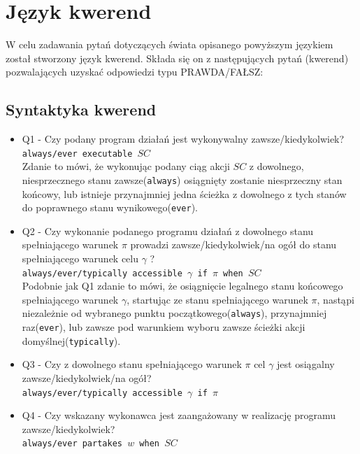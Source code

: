\documentclass{article}
\begin{document}
\newpage
\section{Język kwerend}
W celu zadawania pytań dotyczących świata opisanego powyższym językiem został stworzony język kwerend. Składa się on z następujących pytań (kwerend) pozwalających uzyskać odpowiedzi typu PRAWDA/FAŁSZ:

\subsection{Syntaktyka kwerend}
\begin{itemize}
\item Q1 - Czy podany program działań jest wykonywalny zawsze/kiedykolwiek?\\
{\large\texttt{always/ever executable $SC$}} \\
Zdanie to mówi, że wykonując podany ciąg akcji $SC$ z dowolnego, niesprzecznego stanu zawsze(\texttt{always}) osiągnięty zostanie niesprzeczny stan końcowy, lub istnieje przynajmniej jedna ścieżka z dowolnego z tych stanów do poprawnego stanu wynikowego(\texttt{ever}).


\item Q2 - Czy wykonanie podanego programu działań z dowolnego stanu spełniającego warunek $\pi$ prowadzi zawsze/kiedykolwiek/na ogół do stanu spełniającego warunek celu $\gamma$ ?\\
{\large\texttt{always/ever/typically accessible $\gamma$ if $\pi$ when $SC$}} \\
Podobnie jak Q1 zdanie to mówi, że osiągnięcie legalnego stanu końcowego spełniającego warunek $\gamma$, startując ze stanu spełniającego warunek $\pi$, nastąpi niezależnie od wybranego punktu początkowego(\texttt{always}), przynajmniej raz(\texttt{ever}), lub zawsze pod warunkiem wyboru zawsze ścieżki akcji domyślnej(\texttt{typically}).



\item Q3 - Czy z dowolnego stanu spełniającego warunek $\pi$ cel $\gamma$ jest osiągalny zawsze/kiedykolwiek/na ogół?\\
{\large\texttt{always/ever/typically accessible $\gamma$ if $\pi$}}


\item Q4 - Czy wskazany wykonawca jest zaangażowany w realizację programu zawsze/kiedykolwiek?\\
{\large\texttt{always/ever partakes $w$ when $SC$}} \\

\end{itemize}
\end{document}
